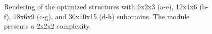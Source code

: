\begin{figure}
        \hfill
        \hfill
        \hspace*{\fill}
        \caption{Rendering of the optimized structures with 6x2x3 (a-e), 12x4x6 (b-f), 18x6x9 (c-g), and 30x10x15 (d-h) subomains. The module presents a 2x2x2 complexity.}
        \label{fig:05_scale_results}
    \end{figure}

